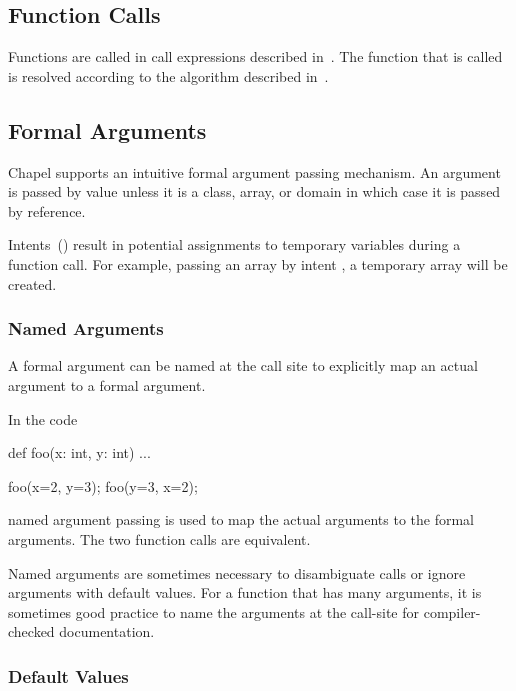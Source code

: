 \subsection{Function Calls}
\label{Function_Calls}

Functions are called in call expressions described
in~.  The function that is called is resolved
according to the algorithm described in~.

\subsection{Formal Arguments}
\label{Formal_Arguments}

Chapel supports an intuitive formal argument passing mechanism.  An
argument is passed by value unless it is a class, array, or domain in
which case it is passed by reference.

Intents~() result in potential assignments to temporary
variables during a function call.  For example, passing an array by
intent , a temporary array will be created.

\subsubsection{Named Arguments}
\label{Named_Arguments}

A formal argument can be named at the call site to explicitly map an
actual argument to a formal argument.

\begin{example}
In the code
\begin{chapel}
def foo(x: int, y: int) { ... }

foo(x=2, y=3);
foo(y=3, x=2);
\end{chapel}
named argument passing is used to map the actual arguments to the
formal arguments.  The two function calls are equivalent.
\end{example}

Named arguments are sometimes necessary to disambiguate calls or
ignore arguments with default values.  For a function that has many
arguments, it is sometimes good practice to name the arguments at the
call-site for compiler-checked documentation.

\subsubsection{Default Values}
\label{Default_Values}


